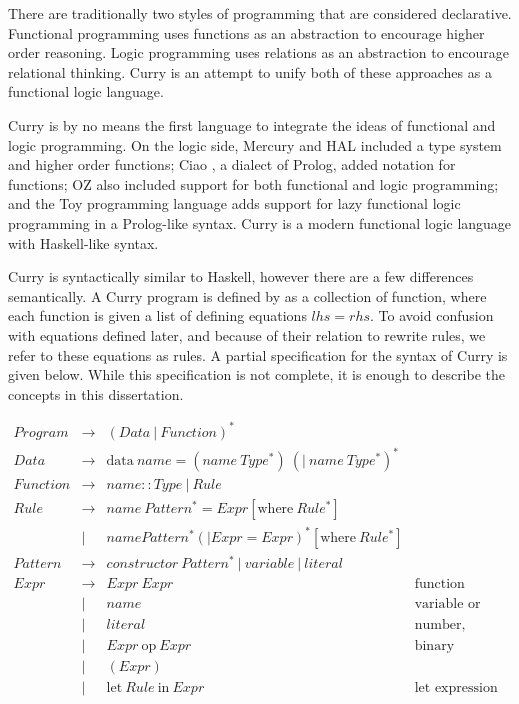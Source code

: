 
There are traditionally two styles of programming that are considered declarative.
Functional programming uses functions as an abstraction to encourage higher order reasoning.
Logic programming uses relations as an abstraction to encourage relational thinking.
Curry is an attempt to unify both of these approaches as a functional logic language.

Curry is by no means the first language to integrate the ideas of functional and logic programming.
On the logic side, Mercury \cite{mercury} and HAL \cite{hal} included a type system and higher order functions;
Ciao \cite{caio}, a dialect of Prolog, added notation for functions;
OZ \cite{oz} also included support for both functional and logic programming;
and the Toy programming language \cite{toy} adds support for lazy functional logic programming in a Prolog-like syntax.
Curry \cite{Hanus16Curry} is a modern functional logic language with Haskell-like syntax.

Curry is syntactically similar to Haskell, however there are a few differences semantically.
A Curry program is defined by as a collection of function, where each function is given a list of defining equations $lhs = rhs$.
To avoid confusion with equations defined later, and because of their relation to rewrite rules, we refer to these equations as rules.
A partial specification for the syntax of Curry is given below.
While this specification is not complete, it is enough to describe the concepts in this dissertation.

$$\begin{array}{llll}
Program  & \to & (Data\ |\ Function)^* \\
Data     & \to & \text{data}\ name = (name\ Type^*)\ (|\ name\ Type^*)^* \\
Function & \to & name :: Type\ |\ Rule  \\
Rule     & \to & name\ Pattern^* = Expr [\text{where}\ Rule^*] \\
         & |   & name Pattern^* (| Expr = Expr )^* [\text{where}\ Rule^*] \\
Pattern  & \to & constructor\ Pattern^*\ |\ variable\ |\ literal \\
Expr     & \to & Expr\ Expr             & \text{function application}\\
         & |   & name                  & \text{variable or function}\\
         & |   & literal               & \text{number, boolean, or character}\\
         & |   & Expr\ \text{op}\ Expr & \text{binary operation}\\
         & |   & ( Expr )              & \\
         & |   & \text{let}\ Rule\ \text{in}\ Expr  & \text{let expression}
\end{array}$$

